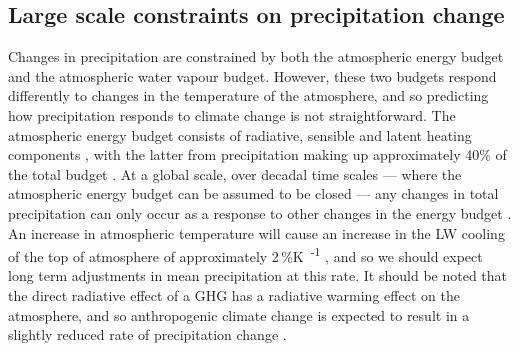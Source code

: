 
\subsection{Large scale constraints on precipitation change}

Changes in precipitation are constrained by both the atmospheric energy budget and the atmospheric water vapour budget.
However, these two budgets respond differently to changes in the temperature of the atmosphere, and so predicting how precipitation responds to climate change is not straightforward.
The atmospheric energy budget consists of radiative, sensible and latent heating components \citep{trenberth_earths_2009}, with the latter from precipitation making up approximately 40\% of the total budget \citep{rosenfeld_flood_2008}.
At a global scale, over decadal time scales --- where the atmospheric energy budget can be assumed to be closed --- any changes in total precipitation can only occur as a response to other changes in the energy budget \citep{allen_constraints_2002}.
An increase in atmospheric temperature will cause an increase in the LW cooling of the top of atmosphere of approximately 2\,\%\unit{K\textsuperscript{-1}} \citep{held_robust_2006}, and so we should expect long term adjustments in mean precipitation at this rate.
It should be noted that the direct radiative effect of a GHG has a radiative warming effect on the atmosphere, and so anthropogenic climate change is expected to result in a slightly reduced rate of precipitation change \citep{allen_constraints_2002}.

